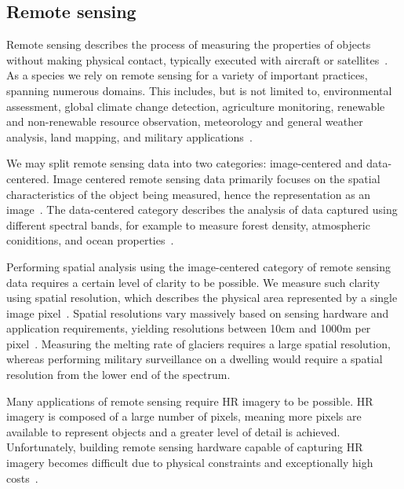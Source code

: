 \subsection{Remote sensing}
Remote sensing describes the process of measuring the properties of objects without making physical contact, typically executed with aircraft or satellites~\cite{remoteSensing,remoteSensingImageProcessing}. As a species we rely on remote sensing for a variety of important practices, spanning numerous domains. This includes, but is not limited to, environmental assessment, global climate change detection, agriculture monitoring, renewable and non-renewable resource observation, meteorology and general weather analysis, land mapping, and military applications~\cite{remoteSensingImageProcessing, remoteSensingUses, remoteSensingGANsReview}.

We may split remote sensing data into two categories: image-centered and data-centered. Image centered remote sensing data primarily focuses on the spatial characteristics of the object being measured, hence the representation as an image~\cite{remoteSensingImageProcessing}. The data-centered category describes the analysis of data captured using different spectral bands, for example to measure forest density, atmospheric coniditions, and ocean properties~\cite{remoteSensingImageProcessing}.

Performing spatial analysis using the image-centered category of remote sensing data requires a certain level of clarity to be possible. We measure such clarity using spatial resolution, which describes the physical area represented by a single image pixel~\cite{ref}. Spatial resolutions vary massively based on sensing hardware and application requirements, yielding resolutions between 10cm and 1000m per pixel~\cite{remoteSensing,remoteSensingImageProcessing}. Measuring the melting rate of glaciers requires a large spatial resolution, whereas performing military surveillance on a dwelling would require a spatial resolution from the lower end of the spectrum.

Many applications of remote sensing require HR imagery to be possible. HR imagery is composed of a large number of pixels, meaning more pixels are available to represent objects and a greater level of detail is achieved. Unfortunately, building remote sensing hardware capable of capturing HR imagery becomes difficult due to physical constraints and exceptionally high costs~\cite{ref}. 


